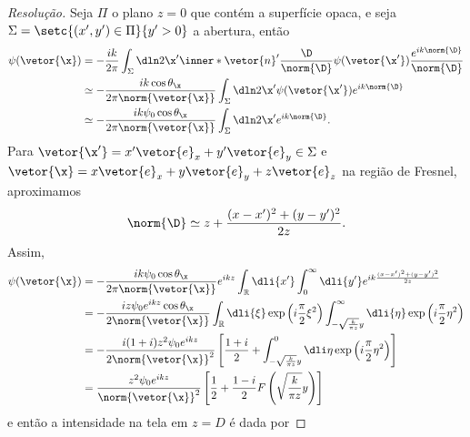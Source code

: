 \begin{proof}[Resolução]
    Seja \(\Pi\) o plano \(z = 0\) que contém a superfície opaca, e seja \(\Sigma = \setc{(x', y') \in \Pi}{y' > 0}\) a abertura, então
    \begin{align*}
        \psi(\vetor{\x}) &= - \frac{i k}{2\pi} \int_{\Sigma} \dln2{\x'} \inner*{\vetor{n}'}{\frac{\D}{\norm{\D}}} \psi(\vetor{\x'}) \frac{e^{ik \norm{\D}}}{\norm{\D}}\\
                         &\simeq -\frac{ik \cos\theta_{\x}}{2\pi \norm{\vetor{\x}}} \int_{\Sigma} \dln2{\x'} \psi(\vetor{\x'}) e^{ik \norm{\D}}\\
                         &\simeq -\frac{ik \psi_0 \cos\theta_{\x}}{2\pi \norm{\vetor{\x}}} \int_{\Sigma} \dln2{\x'} e^{ik \norm{\D}}.
    \end{align*}
    Para \(\vetor{\x'} = x' \vetor{e}_x + y' \vetor{e}_y \in \Sigma\) e \(\vetor{\x} = x \vetor{e}_x + y \vetor{e}_y + z \vetor{e}_z\) na região de Fresnel, aproximamos
    \begin{equation*}
        \norm{\D} \simeq z + \frac{(x - x')^2 + (y - y')^2}{2z}.
    \end{equation*}
    Assim,
    \begin{align*}
        \psi(\vetor{\x}) &= -\frac{ik \psi_0 \cos\theta_{\x}}{2\pi \norm{\vetor{\x}}} e^{ikz} \int_{\mathbb{R}} \dli{x'} \int_{0}^\infty \dli{y'}e^{ik \frac{(x - x')^2 + (y - y')^2}{2z}}\\
                         &= -\frac{iz \psi_0 e^{ikz} \cos\theta_{\x}}{2\norm{\vetor{\x}}}  \int_{\mathbb{R}} \dli{\xi} \exp\left(i\frac{\pi}{2}\xi^2\right) \int_{-\sqrt{\frac{k}{\pi z}}y}^{\infty} \dli{\eta}\exp\left(i \frac{\pi}{2} \eta^2\right)\\
                         &= -\frac{i (1 + i)z^2 \psi_0 e^{ikz}}{2 \norm{\vetor{\x}}^2}  \left[\frac{1 + i}{2} + \int_{-\sqrt{\frac{k}{\pi z}}y}^0 \dli\eta \exp\left(i\frac{\pi}{2} \eta^2\right)\right]\\
                         &= \frac{z^2 \psi_0 e^{ikz}}{\norm{\vetor{\x}}^2} \left[\frac{1}{2} + \frac{1-i}{2}F\left(\sqrt{\frac{k}{\pi{z}}}y\right)\right]\\
    \end{align*}
    e então a intensidade na tela em \(z = D\) é dada por

\end{proof}

